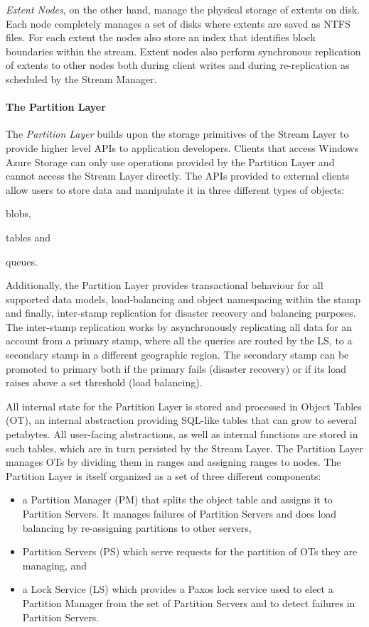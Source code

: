 \emph{Extent Nodes}, on the other hand, manage the physical storage of extents on disk.
Each node completely manages a set of disks where extents are saved as NTFS files.
For each extent the nodes also store an index that identifies block boundaries within the stream.
Extent nodes also perform synchronous replication of extents to other nodes both during client writes and during re-replication as scheduled by the Stream Manager.

\paragraph{The Partition Layer}

The \emph{Partition Layer} builds upon the storage primitives of the Stream Layer to provide higher level APIs to application developers.
Clients that access Windows Azure Storage can only use operations provided by the Partition Layer and cannot access the Stream Layer directly.
The APIs provided to external clients allow users to store data and manipulate it in three different types of objects:
\begin{inparaenum}[i)]
    \item blobs,
    \item tables and
    \item queues.
\end{inparaenum}
Additionally, the Partition Layer provides transactional behaviour for all supported data models, load-balancing and object namespacing within the stamp and finally, inter-stamp replication for disaster recovery and balancing purposes.
The inter-stamp replication works by asynchronously replicating all data for an account from a primary stamp, where all the queries are routed by the LS, to a secondary stamp in a different geographic region.
The secondary stamp can be promoted to primary both if the primary fails (disaster recovery) or if its load raises above a set threshold (load balancing).

All internal state for the Partition Layer is stored and processed in Object Tables (OT), an internal abstraction providing SQL-like tables that can grow to several petabytes.
All user-facing abstractions, as well as internal functions are stored in such tables, which are in turn persisted by the Stream Layer.
The Partition Layer manages OTs by dividing them in ranges and assigning ranges to nodes.
The Partition Layer is itself organized as a set of three different components:
\begin{itemize}
    \item a Partition Manager (PM) that splits the object table and assigns it to Partition Servers. It manages failures of Partition Servers and does load balancing by re-assigning partitions to other servers,
    \item Partition Servers (PS) which serve requests for the partition of OTs they are managing, and
    \item a Lock Service (LS) which provides a Paxos \cite{DBLP:journals/tocs/Lamport98} lock service used to elect a Partition Manager from the set of Partition Servers and to detect failures in Partition Servers.
\end{itemize}